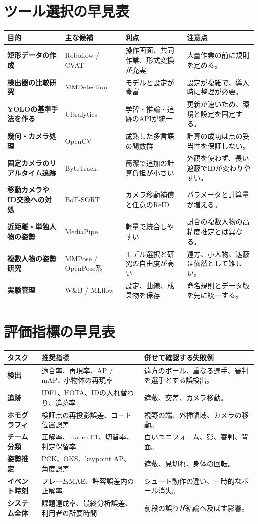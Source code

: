 \documentclass[11pt,a4paper,oneside]{report}
\begin{document}
\chapter{ツール選択の早見表}

\begin{tabularx}{\textwidth}{>{\bfseries\RaggedRight}p{3cm} Y Y Y}
\toprule
目的 & 主な候補 & 利点 & 注意点 \\
\midrule
矩形データの作成 & Roboflow / CVAT & 操作画面、共同作業、形式変換が充実 & 大量作業の前に規則を定める。\\
検出器の比較研究 & MMDetection & モデルと設定が豊富 & 設定が複雑で、導入時に整理が必要。\\
YOLOの基準手法を作る & Ultralytics & 学習・推論・追跡のAPIが統一 & 更新が速いため、環境と設定を固定する。\\
幾何・カメラ処理 & OpenCV & 成熟した多言語の関数群 & 計算の成功は点の妥当性を保証しない。\\
固定カメラのリアルタイム追跡 & ByteTrack & 簡潔で追加の計算負担が小さい & 外観を使わず、長い遮蔽でIDが変わりやすい。\\
移動カメラやID交換への対処 & BoT-SORT & カメラ移動補償と任意のReID & パラメータと計算量が増える。\\
近距離・単独人物の姿勢 & MediaPipe & 軽量で統合しやすい & 試合の複数人物の高精度推定とは異なる。\\
複数人物の姿勢研究 & MMPose / OpenPose系 & モデル選択と研究の自由度が高い & 遠方、小人物、遮蔽は依然として難しい。\\
実験管理 & W\&B / MLflow & 設定、曲線、成果物を保存 & 命名規則とデータ版を先に統一する。\\
\bottomrule
\end{tabularx}

\chapter{評価指標の早見表}

\begin{tabularx}{\textwidth}{>{\bfseries\RaggedRight}p{3.3cm} Y Y}
\toprule
タスク & 推奨指標 & 併せて確認する失敗例 \\
\midrule
検出 & 適合率、再現率、AP / mAP、小物体の再現率 & 遠方のボール、重なる選手、審判を選手とする誤検出。\\
追跡 & IDF1、HOTA、IDの入れ替わり、追跡率 & 遮蔽、交差、カメラ移動。\\
ホモグラフィ & 検証点の再投影誤差、コート位置誤差 & 視野の端、外挿領域、カメラの移動。\\
チーム分類 & 正解率、macro F1、切替率、判定保留率 & 白いユニフォーム、影、審判、背面。\\
姿勢推定 & PCK、OKS、keypoint AP、角度誤差 & 遮蔽、見切れ、身体の回転。\\
イベント時刻 & フレームMAE、許容誤差内の正解率 & シュート動作の違い、一時的なボール消失。\\
システム全体 & 課題達成率、最終分析誤差、利用者の所要時間 & 前段の誤りが結論へ及ぼす影響。\\
\bottomrule
\end{tabularx}
\end{document}
